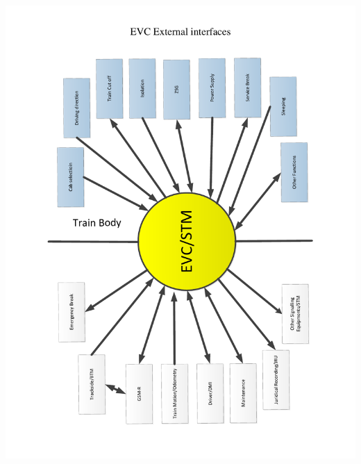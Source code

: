 \documentclass{template/openetcs_article}
\begin{document}
\tableofcontents
\newpage





 

\includegraphics[trim = 20mm 20mm 20mm 10mm, clip, width=15cm]{figs/external_interfaces.pdf}
\end{document}
